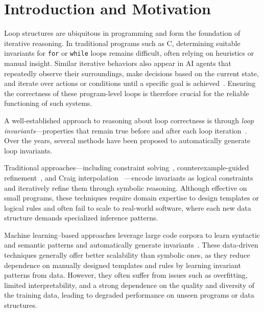 \section{Introduction and Motivation}
Loop structures are ubiquitous in programming and form the foundation of iterative reasoning. In traditional programs such as C, determining suitable invariants for \texttt{for} or \texttt{while} loops remains difficult, often relying on heuristics or manual insight. Similar iterative behaviors also appear in AI agents that repeatedly observe their surroundings, make decisions based on the current state, and iterate over actions or conditions until a specific goal is achieved~\cite{evertz2003loop, wu2022survey, mosqueira2023human}. Ensuring the correctness of these program-level loops is therefore crucial for the reliable functioning of such systems.  

A well-established approach to reasoning about loop correctness is through \emph{loop invariants}—properties that remain true before and after each loop iteration~\cite{furia2014loop, d2008survey}. Over the years, several methods have been proposed to automatically generate loop invariants.

Traditional approaches—including constraint solving~\cite{Coln2003LinearIG,8603013}, counterexample-guided refinement~\cite{clarke2000counterexample,bogomolov2017counterexample}, and Craig interpolation~\cite{jhala2006practical, mcmillan2010lazy} —encode invariants as logical constraints and iteratively refine them through symbolic reasoning. Although effective on small programs, these techniques require domain expertise to design templates or logical rules and often fail to scale to real-world software, where each new data structure demands specialized inference patterns.

Machine learning–based approaches leverage large code corpora to learn syntactic and semantic patterns and automatically generate invariants~\cite{garg2014ice,garg2016learning,nguyen2017counterexample,si2020code2inv}. These data-driven techniques generally offer better scalability than symbolic ones, as they reduce dependence on manually designed templates and rules by learning invariant patterns from data. 
However, they often suffer from issues such as overfitting, limited interpretability, and a strong dependence on the quality and diversity of the training data, leading to degraded performance on unseen programs or data structures.

